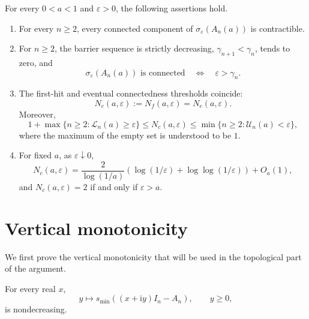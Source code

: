 \documentclass[review,hidelinks,onefignum,onetabnum]{siamart251216}
\newcommand{\ii}{\mathrm i}
\begin{document}
\begin{theorem}\label{thm:main}
For every $0<a<1$ and $\varepsilon>0$, the following assertions hold.
\begin{enumerate}
\item For every $n\geq2$, every connected component of
$\sigma_\varepsilon(A_n(a))$ is
contractible.
\item For $n\geq2$, the barrier sequence is strictly decreasing,
$\gamma_{n+1}<\gamma_n$, tends to zero, and
\[
 \sigma_\varepsilon(A_n(a))\text{ is connected}
 \quad\Longleftrightarrow\quad \varepsilon>\gamma_n.
\]
\item The first-hit and eventual connectedness thresholds coincide:
\[
 N_c(a,\varepsilon):=N_f(a,\varepsilon)=N_e(a,\varepsilon).
\]
Moreover,
\begin{equation}\label{eq:N-two-sided-main}
 1+\max\{n\geq2:\mathcal L_n(a)\geq\varepsilon\}
 \leq N_c(a,\varepsilon)\leq
 \min\{n\geq2:\mathcal U_n(a)<\varepsilon\},
\end{equation}
where the maximum of the empty set is understood to be $1$.
\item For fixed $a$, as $\varepsilon\downarrow0$,
\begin{equation}\label{eq:N-asymptotic-main}
 N_c(a,\varepsilon)=\frac{2}{\log(1/a)}
 \left(\log(1/\varepsilon)+\log\!\log(1/\varepsilon)\right)+O_a(1),
\end{equation}
and $N_c(a,\varepsilon)=2$ if and only if $\varepsilon>a$.
\end{enumerate}
\end{theorem}

\section{Vertical monotonicity}\label{sec:vertical}

We first prove the vertical monotonicity that will be used in the
topological part of the argument.

\begin{lemma}\label{lem:vertical}
For every real \(x\),
\[
 y\longmapsto s_{\min}((x+\ii y)I_n-A_n),\qquad y\geq0,
\]
is nondecreasing.
\end{lemma}
\end{document}
